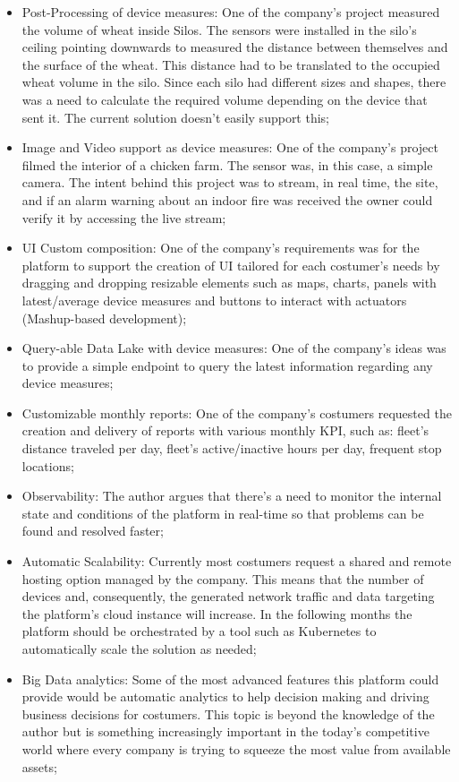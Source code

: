 \begin{itemize}
    \item Post-Processing of device measures: One of the company's project measured the volume of wheat inside Silos. The sensors were installed in the silo's ceiling pointing downwards to measured the distance between themselves and the surface of the wheat. This distance had to be translated to the occupied wheat volume in the silo. Since each silo had different sizes and shapes, there was a need to calculate the required volume depending on the device that sent it. The current solution doesn't easily support this;
    \item Image and Video support as device measures: One of the company's project filmed the interior of a chicken farm. The sensor was, in this case, a simple camera. The intent behind this project was to stream, in real time, the site, and if an alarm warning about an indoor fire was received the owner could verify it by accessing the live stream;
    \item UI Custom composition: One of the company's requirements was for the platform to support the creation of \gls{UI} tailored for each costumer's needs by dragging and dropping resizable elements such as maps, charts, panels with latest/average device measures and buttons to interact with actuators (Mashup-based development);
    \item Query-able Data Lake with device measures: One of the company's ideas was to provide a simple endpoint to query the latest information regarding any device measures;
    \item Customizable monthly reports: One of the company's costumers requested the creation and delivery of reports with various monthly \gls{KPI}, such as: fleet's distance traveled per day, fleet's active/inactive hours per day, frequent stop locations;
    \item Observability: The author argues that there's a need to monitor the internal state and conditions of the platform in real-time so that problems can be found and resolved faster;
    \item Automatic Scalability: Currently most costumers request a shared and remote hosting option managed by the company. This means that the number of devices and, consequently, the generated network traffic and data targeting the platform's cloud instance will increase. In the following months the platform should be orchestrated by a tool such as Kubernetes to automatically scale the solution as needed;
    \item Big Data analytics: Some of the most advanced features this platform could provide would be automatic analytics to help decision making and driving business decisions for costumers. This topic is beyond the knowledge of the author but is something increasingly important in the today's competitive world where every company is trying to squeeze the most value from available assets;

\end{itemize}
